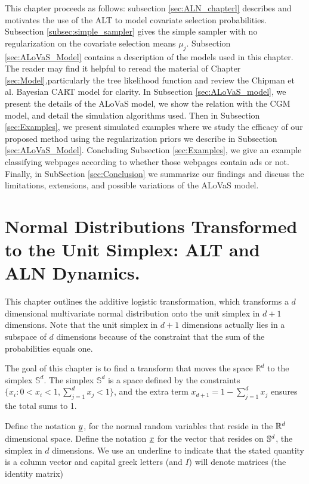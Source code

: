 This chapter proceeds as follows: subsection \ref{sec:ALN_chapterl} describes and motivates the use of the ALT to model covariate selection probabilities. Subsection \ref{subsec:simple_sampler} gives the simple sampler with no regularization on the covariate selection means $\mu_j$. Subsection \ref{sec:ALoVaS_Model} contains a description of the models used in this chapter. The reader may find it helpful to reread the material of Chapter \ref{sec:Model},particularly the tree likelihood function and review the Chipman et al. Bayesian CART \cite{chipman1998bayesian} model for clarity. In Subsection \ref{sec:ALoVaS_model}, we present the details of the ALoVaS model, we show the relation with the CGM model, and detail the simulation algorithms used. Then in Subsection \ref{sec:Examples}, we present simulated examples where we study the efficacy of our proposed method using the regularization priors we describe in Subsection \ref{sec:ALoVaS_Model}. Concluding Subsection \ref{sec:Examples}, we give an example classifying webpages according to whether those webpages contain ads or not. Finally, in SubSection \ref{sec:Conclusion} we summarize our findings and discuss the limitations, extensions, and possible variations of the ALoVaS model.      


\section{Normal Distributions Transformed to the Unit Simplex: ALT and ALN Dynamics. }\label{sec:ALN_chapter}

This chapter outlines the additive logistic transformation, which transforms a $d$ dimensional multivariate normal distribution onto the unit simplex in $d+1$ dimensions. Note that the unit simplex in $d+1$ dimensions actually lies in a subspace of $d$ dimensions because of the constraint that the sum of the probabilities equals one. 

The goal of this chapter is to find a transform that moves the space $\mathbb{R}^d$  to the simplex $\mathbb{S}^d$.  The simplex $\mathbb{S}^d$ is a space defined by the constraints $\{x_i: 0<x_i<1, \sum_{j=1}^dx_j <1 \}$, and the extra term $x_{d+1}=1-\sum_{j=1}^d x_j$ ensures the total sums to 1.  

Define the notation $\underline{y}$, for the normal random variables that reside in the $\mathbb{R}^{d}$  dimensional space. Define the notation $\underline{x}$  for the vector that resides on $\mathbb{S}^{d}$, the simplex in $d$ dimensions. We use an underline to indicate that the stated quantity is a column vector and capital greek letters (and $I$) will denote matrices (the identity matrix) 

